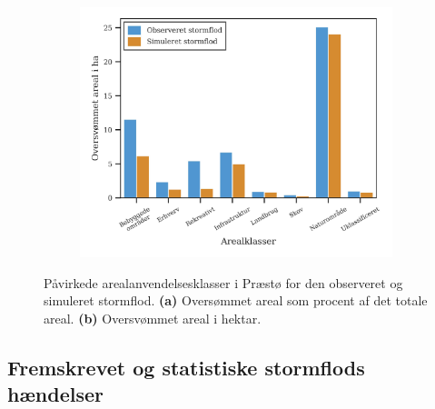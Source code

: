 \begin{figure}[H]
\begin{subfigure}[b]{0.5\textwidth}
        \includegraphics[width=1\linewidth]{images/Resultater/areal_anvendelses_grafer/praestoe_oversvommet_Hektar.jpg}
        \caption{}
        \label{Subfig: Hektar præstø}
    \end{subfigure}
    \caption{Påvirkede arealanvendelsesklasser i Præstø for den observeret og simuleret stormflod. \textbf{(a)} Oversømmet areal som procent af det totale areal. \textbf{(b)} Oversvømmet areal i hektar.}
    \label{Figur: Påvirket arealanvendelse Præstø}
\end{figure}


\newpage
\subsection{Fremskrevet og statistiske stormflods hændelser}

